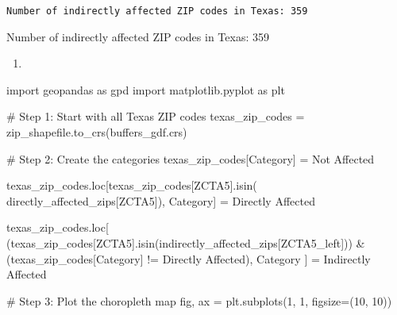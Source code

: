 \documentclass[
  letterpaper,
  DIV=11,
  numbers=noendperiod]{scrartcl}
\newenvironment{Shaded}{\begin{snugshade}}{\end{snugshade}}
\newcommand{\CommentTok}[1]{\textcolor[rgb]{0.37,0.37,0.37}{#1}}
\newcommand{\DecValTok}[1]{\textcolor[rgb]{0.68,0.00,0.00}{#1}}
\newcommand{\ImportTok}[1]{\textcolor[rgb]{0.00,0.46,0.62}{#1}}
\newcommand{\NormalTok}[1]{\textcolor[rgb]{0.00,0.23,0.31}{#1}}
\newcommand{\OperatorTok}[1]{\textcolor[rgb]{0.37,0.37,0.37}{#1}}
\newcommand{\StringTok}[1]{\textcolor[rgb]{0.13,0.47,0.30}{#1}}
\providecommand{\tightlist}{%
  \setlength{\itemsep}{0pt}\setlength{\parskip}{0pt}}\usepackage{longtable,booktabs,array}
\begin{document}
\begin{verbatim}
Number of indirectly affected ZIP codes in Texas: 359
\end{verbatim}

Number of indirectly affected ZIP codes in Texas: 359

\begin{enumerate}
\def\labelenumi{\arabic{enumi}.}
\setcounter{enumi}{3}
\tightlist
\item
\end{enumerate}

\begin{Shaded}
\begin{Highlighting}[]
\ImportTok{import}\NormalTok{ geopandas }\ImportTok{as}\NormalTok{ gpd}
\ImportTok{import}\NormalTok{ matplotlib.pyplot }\ImportTok{as}\NormalTok{ plt}

\CommentTok{\# Step 1: Start with all Texas ZIP codes}
\NormalTok{texas\_zip\_codes }\OperatorTok{=}\NormalTok{ zip\_shapefile.to\_crs(buffers\_gdf.crs)}

\CommentTok{\# Step 2: Create the categories}
\NormalTok{texas\_zip\_codes[}\StringTok{\textquotesingle{}Category\textquotesingle{}}\NormalTok{] }\OperatorTok{=} \StringTok{\textquotesingle{}Not Affected\textquotesingle{}}

\NormalTok{texas\_zip\_codes.loc[texas\_zip\_codes[}\StringTok{\textquotesingle{}ZCTA5\textquotesingle{}}\NormalTok{].isin(}
\NormalTok{    directly\_affected\_zips[}\StringTok{\textquotesingle{}ZCTA5\textquotesingle{}}\NormalTok{]), }\StringTok{\textquotesingle{}Category\textquotesingle{}}\NormalTok{] }\OperatorTok{=} \StringTok{\textquotesingle{}Directly Affected\textquotesingle{}}

\NormalTok{texas\_zip\_codes.loc[}
\NormalTok{    (texas\_zip\_codes[}\StringTok{\textquotesingle{}ZCTA5\textquotesingle{}}\NormalTok{].isin(indirectly\_affected\_zips[}\StringTok{\textquotesingle{}ZCTA5\_left\textquotesingle{}}\NormalTok{])) }\OperatorTok{\&}
\NormalTok{    (texas\_zip\_codes[}\StringTok{\textquotesingle{}Category\textquotesingle{}}\NormalTok{] }\OperatorTok{!=} \StringTok{\textquotesingle{}Directly Affected\textquotesingle{}}\NormalTok{), }\StringTok{\textquotesingle{}Category\textquotesingle{}}
\NormalTok{] }\OperatorTok{=} \StringTok{\textquotesingle{}Indirectly Affected\textquotesingle{}}

\CommentTok{\# Step 3: Plot the choropleth map}
\NormalTok{fig, ax }\OperatorTok{=}\NormalTok{ plt.subplots(}\DecValTok{1}\NormalTok{, }\DecValTok{1}\NormalTok{, figsize}\OperatorTok{=}\NormalTok{(}\DecValTok{10}\NormalTok{, }\DecValTok{10}\NormalTok{))}


\end{Highlighting}
\end{Shaded}
\end{document}
